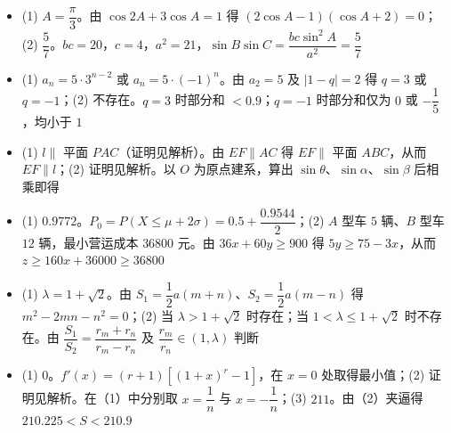 \begin{itemize}[leftmargin=2.6em]
  \item[\textbf{17.}] (1) $A=\dfrac\pi3$。由 $\cos2A+3\cos A=1$ 得 $(2\cos A-1)(\cos A+2)=0$；(2) $\dfrac57$。$bc=20$，$c=4$，$a^2=21$，$\sin B\sin C=\dfrac{bc\sin^2A}{a^2}=\dfrac57$
  \item[\textbf{18.}] (1) $a_n=5\cdot3^{n-2}$ 或 $a_n=5\cdot(-1)^n$。由 $a_2=5$ 及 $|1-q|=2$ 得 $q=3$ 或 $q=-1$；(2) 不存在。$q=3$ 时部分和 $<0.9$；$q=-1$ 时部分和仅为 $0$ 或 $-\dfrac15$，均小于 $1$
  \item[\textbf{19.}] (1) $l\parallel$ 平面 $PAC$（证明见解析）。由 $EF\parallel AC$ 得 $EF\parallel$ 平面 $ABC$，从而 $EF\parallel l$；(2) 证明见解析。以 $O$ 为原点建系，算出 $\sin\theta$、$\sin\alpha$、$\sin\beta$ 后相乘即得
  \item[\textbf{20.}] (1) $0.9772$。$P_0=P(X\leqslant\mu+2\sigma)=0.5+\dfrac{0.9544}{2}$；(2) $A$ 型车 $5$ 辆、$B$ 型车 $12$ 辆，最小营运成本 $36800$ 元。由 $36x+60y\geqslant900$ 得 $5y\geqslant75-3x$，从而 $z\geqslant160x+36000\geqslant36800$
  \item[\textbf{21.}] (1) $\lambda=1+\sqrt2$。由 $S_1=\dfrac12a(m+n)$、$S_2=\dfrac12a(m-n)$ 得 $m^2-2mn-n^2=0$；(2) 当 $\lambda>1+\sqrt2$ 时存在；当 $1<\lambda\leqslant1+\sqrt2$ 时不存在。由 $\dfrac{S_1}{S_2}=\dfrac{r_m+r_n}{r_m-r_n}$ 及 $\dfrac{r_m}{r_n}\in(1,\lambda)$ 判断
  \item[\textbf{22.}] (1) $0$。$f'(x)=(r+1)\left[(1+x)^r-1\right]$，在 $x=0$ 处取得最小值；(2) 证明见解析。在（1）中分别取 $x=\dfrac1n$ 与 $x=-\dfrac1n$；(3) $211$。由（2）夹逼得 $210.225<S<210.9$
\end{itemize}
